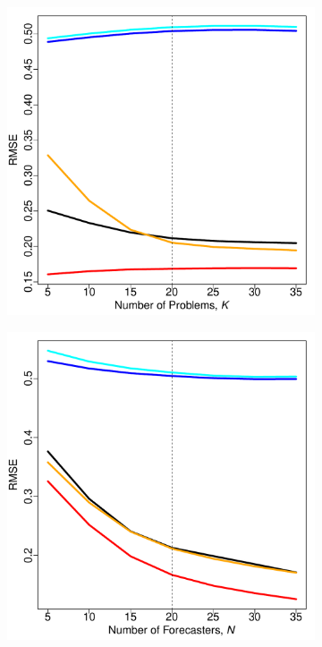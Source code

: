 \documentclass[11pt]{article}
\theoremstyle{definition}
\theoremstyle{definition}
\begin{document}
\begin{figure}[t!]
    	\captionsetup[subfigure]{width=0.98\textwidth }
    \begin{subfigure}{0.5\textwidth}
                \includegraphics[width=\textwidth]{simResX.pdf}
                \label{Nfixed}
        \end{subfigure}%
        \begin{subfigure}{0.5\textwidth}
                \includegraphics[width=\textwidth]{simResXN.pdf}

\end{subfigure}
\end{figure}
\end{document}
